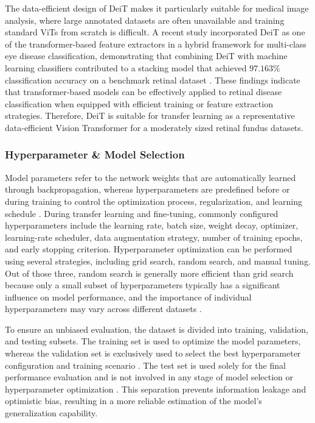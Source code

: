 \documentclass[conference]{IEEEtran}
\begin{document}
The data-efficient design of DeiT makes it particularly suitable for medical image analysis, where large annotated datasets are often unavailable and training standard ViTs from scratch is difficult. A recent study incorporated DeiT as one of the transformer-based feature extractors in a hybrid framework for multi-class eye disease classification, demonstrating that combining DeiT with machine learning classifiers contributed to a stacking model that achieved $97.163\%$ classification accuracy on a benchmark retinal dataset \cite{AlMohimeed2025}. These findings indicate that transformer-based models can be effectively applied to retinal disease classification when equipped with efficient training or feature extraction strategies. Therefore, DeiT is suitable for transfer learning as a representative data-efficient Vision Transformer for a moderately sized retinal fundus datasets.

\subsubsection{Hyperparameter \& Model Selection}

Model parameters refer to the network weights that are automatically learned through backpropagation, whereas hyperparameters are predefined before or during training to control the optimization process, regularization, and learning schedule \cite{Bengio2000}. During transfer learning and fine-tuning, commonly configured hyperparameters include the learning rate, batch size, weight decay, optimizer, learning-rate scheduler, data augmentation strategy, number of training epochs, and early stopping criterion. Hyperparameter optimization can be performed using several strategies, including grid search, random search, and manual tuning. Out of those three, random search is generally more efficient than grid search because only a small subset of hyperparameters typically has a significant influence on model performance, and the importance of individual hyperparameters may vary across different datasets \cite{JMLR:v13:bergstra12a}.

To ensure an unbiased evaluation, the dataset is divided into training, validation, and testing subsets. The training set is used to optimize the model parameters, whereas the validation set is exclusively used to select the best hyperparameter configuration and training scenario \cite{Reyes2024}. The test set is used solely for the final performance evaluation and is not involved in any stage of model selection or hyperparameter optimization \cite{Jiang2021}. This separation prevents information leakage and optimistic bias, resulting in a more reliable estimation of the model's generalization capability.
\end{document}
